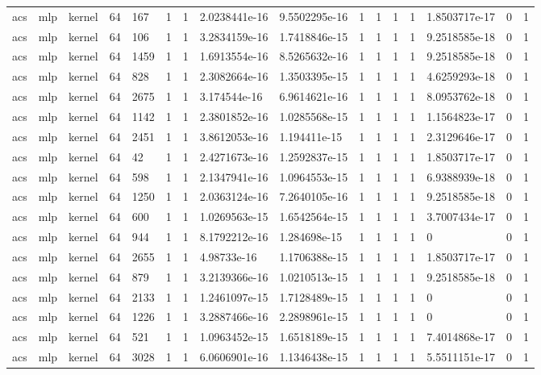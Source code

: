 \begin{tabular}{llllllllllllllll}
acs & mlp & kernel & 64 & 167 & 1 & 1 & 2.0238441e-16 & 9.5502295e-16 & 1 & 1 & 1 & 1 & 1.8503717e-17 & 0 & 1 \\
acs & mlp & kernel & 64 & 106 & 1 & 1 & 3.2834159e-16 & 1.7418846e-15 & 1 & 1 & 1 & 1 & 9.2518585e-18 & 0 & 1 \\
acs & mlp & kernel & 64 & 1459 & 1 & 1 & 1.6913554e-16 & 8.5265632e-16 & 1 & 1 & 1 & 1 & 9.2518585e-18 & 0 & 1 \\
acs & mlp & kernel & 64 & 828 & 1 & 1 & 2.3082664e-16 & 1.3503395e-15 & 1 & 1 & 1 & 1 & 4.6259293e-18 & 0 & 1 \\
acs & mlp & kernel & 64 & 2675 & 1 & 1 & 3.174544e-16 & 6.9614621e-16 & 1 & 1 & 1 & 1 & 8.0953762e-18 & 0 & 1 \\
acs & mlp & kernel & 64 & 1142 & 1 & 1 & 2.3801852e-16 & 1.0285568e-15 & 1 & 1 & 1 & 1 & 1.1564823e-17 & 0 & 1 \\
acs & mlp & kernel & 64 & 2451 & 1 & 1 & 3.8612053e-16 & 1.194411e-15 & 1 & 1 & 1 & 1 & 2.3129646e-17 & 0 & 1 \\
acs & mlp & kernel & 64 & 42 & 1 & 1 & 2.4271673e-16 & 1.2592837e-15 & 1 & 1 & 1 & 1 & 1.8503717e-17 & 0 & 1 \\
acs & mlp & kernel & 64 & 598 & 1 & 1 & 2.1347941e-16 & 1.0964553e-15 & 1 & 1 & 1 & 1 & 6.9388939e-18 & 0 & 1 \\
acs & mlp & kernel & 64 & 1250 & 1 & 1 & 2.0363124e-16 & 7.2640105e-16 & 1 & 1 & 1 & 1 & 9.2518585e-18 & 0 & 1 \\
acs & mlp & kernel & 64 & 600 & 1 & 1 & 1.0269563e-15 & 1.6542564e-15 & 1 & 1 & 1 & 1 & 3.7007434e-17 & 0 & 1 \\
acs & mlp & kernel & 64 & 944 & 1 & 1 & 8.1792212e-16 & 1.284698e-15 & 1 & 1 & 1 & 1 & 0 & 0 & 1 \\
acs & mlp & kernel & 64 & 2655 & 1 & 1 & 4.98733e-16 & 1.1706388e-15 & 1 & 1 & 1 & 1 & 1.8503717e-17 & 0 & 1 \\
acs & mlp & kernel & 64 & 879 & 1 & 1 & 3.2139366e-16 & 1.0210513e-15 & 1 & 1 & 1 & 1 & 9.2518585e-18 & 0 & 1 \\
acs & mlp & kernel & 64 & 2133 & 1 & 1 & 1.2461097e-15 & 1.7128489e-15 & 1 & 1 & 1 & 1 & 0 & 0 & 1 \\
acs & mlp & kernel & 64 & 1226 & 1 & 1 & 3.2887466e-16 & 2.2898961e-15 & 1 & 1 & 1 & 1 & 0 & 0 & 1 \\
acs & mlp & kernel & 64 & 521 & 1 & 1 & 1.0963452e-15 & 1.6518189e-15 & 1 & 1 & 1 & 1 & 7.4014868e-17 & 0 & 1 \\
acs & mlp & kernel & 64 & 3028 & 1 & 1 & 6.0606901e-16 & 1.1346438e-15 & 1 & 1 & 1 & 1 & 5.5511151e-17 & 0 & 1 \\

\end{tabular}

